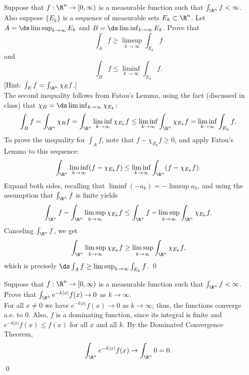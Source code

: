 \begin{hwsol}
Suppose that $f: \R^n \to [0, \infty)$ is a measurable function such that $\int_{\R^n} f < \infty$. Also suppose $\{ E_k \}$ is a sequence of measurable sets $E_k \subset \R^n$. Let $A= \ds\limsup_{k \to \infty} E_k$ and $B= \ds\liminf_{k \to \infty} E_k$. Prove that 
	\[
	\int_A f \geq \limsup_{k \to \infty} \int_{E_k} f
	\]
and 
	\[
	\int_B f \leq \liminf_{k \to \infty} \int_{E_k} f.
	\]
[Hint: $\int_E f= \int_{\R^n} \chi_E f$.] \\

\pf The second inequality follows from Fatou's Lemma, using the fact (discussed in class) that $\chi_B= \ds\liminf_{k\to\infty} \chi_{E_k}$: 
        \[
        \int_B f= \int_{\R^n} \chi_B f= \int_{\R^n} \liminf_{ k \to \infty} \chi_{E_k} f \leq \liminf_{k \to \infty} \int_{\R^n} \chi_{E_k} f= \liminf_{k \to \infty} \int_{E_k} f.
        \]
To prove the inequality for $\int_A f$, note that $f - \chi_{E_{k}} f \geq 0$, and apply Fatou's Lemma to this sequence:
        \[
        \int_{\R^n} \liminf_{k \to \infty} (f - \chi_{E_k} f) \leq \liminf_{k \to \infty} \int_{\R^n} (f - \chi_{E_k} f).
        \]
Expand both sides, recalling that $\liminf (-a_k)= -\limsup a_k$, and using the assumption that $\int_{\R^n} f$ is finite yields
        \[
        \int_{\R^n} f - \int_{\R^n} \limsup_{k \to \infty} \chi_{E_k} f  \leq \int_{\R^n} f - \limsup_{k \to \infty} \int_{\R^n} \chi_{E_k} f.
        \]
Canceling $\int_{\R^n} f$, we get
        \[
        \int_{\R^n} \limsup_{k \to \infty} \chi_{E_k} f \geq \limsup_{k \to \infty} \int_{\R^n} \chi_{E_k} f,
        \]
which is precisely $\ds \int_{A} f \geq \limsup_{k \to \infty} \int_{E_k}f$. \qed \\
\end{hwsol}


\begin{hwsol}
Suppose that $f: \R^n \to [0, \infty)$ is a measurable function such that $\int_{\R^n} f < \infty$. Prove that $\int_{\R^n} e^{-k|x|} f(x) \to 0$ as $k \to \infty$. \\

\pf For all $x \neq 0$ we have $e^{-k|x|} f(x) \to 0$ as $k \to \infty$; thus, the functions converge a.e. to $0$. Also, $f$ is a dominating function, since its integral is finite and $e^{-k|x|} f(x) \leq f(x)$ for all $x$ and all $k$. By the Dominated Convergence Theorem, 
	\[ 
	\int_{\R^n} e^{-k|x|} f(x) \to \int_{\R^n} 0= 0.
	\] \qed \\
\end{hwsol}


